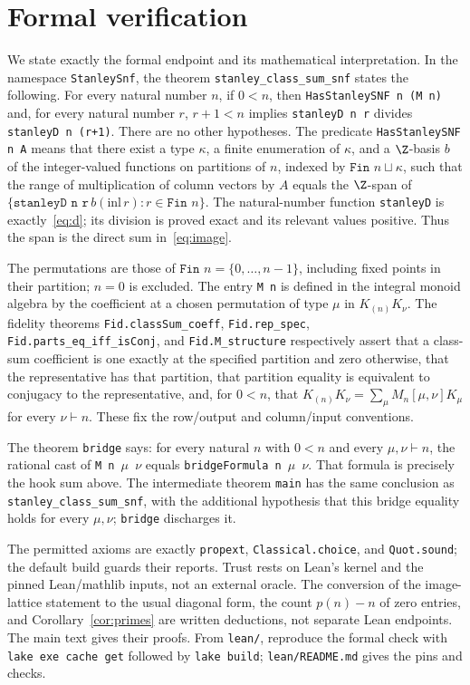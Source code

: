 \section{Formal verification}\label{sec:formal}
We state exactly the formal endpoint and its mathematical interpretation.
In the namespace \texttt{StanleySnf}, the theorem
\texttt{stanley\_class\_sum\_\allowbreak snf} states the following. For every natural number $n$,
if $0<n$, then \texttt{HasStanleySNF n (M n)} and, for every natural
number $r$, $r+1<n$ implies
\texttt{stanleyD n r} divides \texttt{stanleyD n (r+1)}.
There are no other hypotheses.
The predicate \texttt{HasStanleySNF n A} means that there exist a type
$\kappa$, a finite enumeration of $\kappa$, and a $\Z$-basis
$b$ of the integer-valued functions on partitions of $n$, indexed by
$\texttt{Fin }n\sqcup\kappa$, such that the range of multiplication of
column vectors by $A$ equals the $\Z$-span of
$\{\texttt{stanleyD n r}\,b(\mathrm{inl}\,r):r\in\texttt{Fin }n\}$.
The natural-number function \texttt{stanleyD} is exactly~\eqref{eq:d};
its division is proved exact and its relevant values positive.
Thus the span is the direct sum in~\eqref{eq:image}.

The permutations are those of $\texttt{Fin }n=\{0,\ldots,n-1\}$,
including fixed points in their partition; $n=0$ is excluded.
The entry \texttt{M n} is defined in the integral monoid algebra by the
coefficient at a chosen permutation of type $\mu$ in $K_{(n)}K_\nu$.
The fidelity theorems \texttt{Fid.classSum\_coeff},
\texttt{Fid.rep\_spec}, \texttt{Fid.parts\_eq\_iff\_isConj}, and
\texttt{Fid.M\_structure} respectively assert that a class-sum coefficient
is one exactly at the specified partition and zero otherwise, that the
representative has that partition, that partition equality is equivalent
to conjugacy to the representative, and, for $0<n$, that
$K_{(n)}K_\nu=\sum_\mu M_n[\mu,\nu]K_\mu$ for every $\nu\vdash n$.
These fix the row/output and column/input conventions.

The theorem \texttt{bridge} says: for every natural $n$ with $0<n$ and
every $\mu,\nu\vdash n$, the rational cast of \texttt{M n \ensuremath{\mu} \ensuremath{\nu}}
equals \texttt{bridgeFormula n \ensuremath{\mu} \ensuremath{\nu}}.
That formula is precisely the hook sum above.
The intermediate theorem \texttt{main} has the same conclusion as
\texttt{stanley\_class\_sum\_\allowbreak snf}, with the additional hypothesis that
this bridge equality holds for every $\mu,\nu$; \texttt{bridge} discharges it.

The permitted axioms are exactly \texttt{propext},
\texttt{Classical.choice}, and \texttt{Quot.sound}; the default build guards
their reports. Trust rests on Lean's kernel and the pinned Lean/mathlib
inputs, not an external oracle. The conversion of the image-lattice
statement to the usual diagonal form, the count $p(n)-n$ of zero entries,
and Corollary~\ref{cor:primes} are written deductions, not separate Lean
endpoints. The main text gives their proofs.
From \texttt{lean/}, reproduce the formal check with
\texttt{lake exe cache get} followed by \texttt{lake build};
\texttt{lean/README.md} gives the pins and checks.

